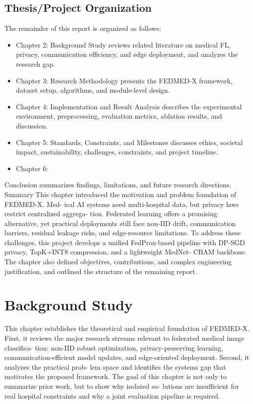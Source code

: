 \documentclass[12pt,a4paper]{report}
\begin{document}
\section{Thesis/Project Organization}
The remainder of this report is organized as follows:
\begin{itemize}
\item Chapter 2: Background Study reviews related literature on medical FL, privacy, communication efficiency, and edge deployment, and analyzes the research gap.
\item Chapter 3: Research Methodology presents the FEDMED-X framework, dataset setup, algorithms, and module-level design.
\item Chapter 4: Implementation and Result Analysis describes the experimental environment, preprocessing, evaluation metrics, ablation results, and discussion.
\item Chapter 5: Standards, Constraints, and Milestones discusses ethics, societal impact, sustainability, challenges, constraints, and project timeline.
\item Chapter 6:
\end{itemize}
Conclusion summarizes findings, limitations, and future research directions.
Summary
This chapter introduced the motivation and problem foundation of FEDMED-X. Med- ical AI systems need multi-hospital data, but privacy laws restrict centralized aggrega- tion. Federated learning offers a promising alternative, yet practical deployments still face non-IID drift, communication barriers, residual leakage risks, and edge-resource limitations. To address these challenges, this project develops a unified FedProx-based pipeline with DP-SGD privacy, TopK+INT8 compression, and a lightweight MedNet-
CBAM backbone.
The chapter also defined objectives, contributions, and complex engineering justification, and outlined the structure of the remaining report.

\chapter{Background Study}
This chapter establishes the theoretical and empirical foundation of FEDMED-X. First, it reviews the major research streams relevant to federated medical image classifica- tion: non-IID robust optimization, privacy-preserving learning, communication-efficient model updates, and edge-oriented deployment. Second, it analyzes the practical prob- lem space and identifies the systems gap that motivates the proposed framework. The goal of this chapter is not only to summarize prior work, but to show why isolated so- lutions are insufficient for real hospital constraints and why a joint evaluation pipeline is required.
\end{document}
